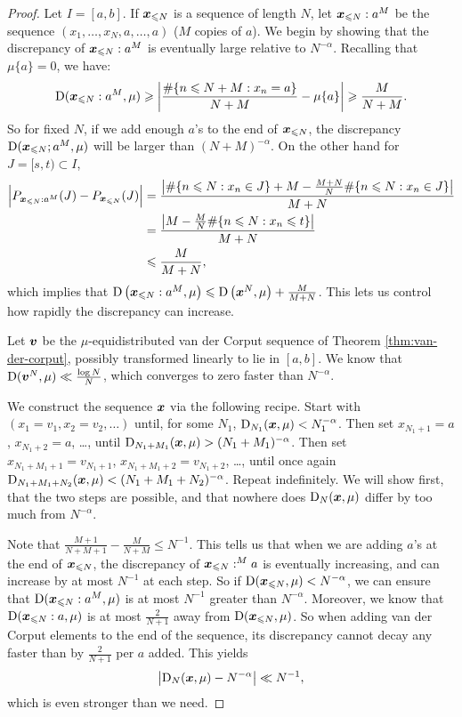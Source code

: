 \begin{proof}
Let $I = [a,b]$. If ${\boldsymbol x}_{\leqslant N}$ is a sequence of length $N$, let 
${\boldsymbol x}_{\leqslant N}: a^M$ be the sequence $(x_1,\dots,x_N,a,\dots,a)$ ($M$ copies 
of $a$). We begin by showing that the discrepancy of ${\boldsymbol x}_{\leqslant N}:a^M$ 
is eventually large relative to $N^{-\alpha}$. Recalling that $\mu\{a\} = 0$, 
we have:
\[
	\operatorname{D}({\boldsymbol x}_{\leqslant N}: a^M,\mu)
		\geqslant \left| \frac{\#\{ n\leqslant N+M : x_n = a\}}{N+M} - \mu\{a\}\right| 
		\geqslant \frac{M}{N+M} .
\]
So for fixed $N$, if we add enough $a$'s to the end of ${\boldsymbol x}_{\leqslant N}$, the 
discrepancy $\operatorname{D}({\boldsymbol x}_{\leqslant N};a^M,\mu)$ will be larger than 
$(N+M)^{-\alpha}$. On the other hand for $J = [s,t)\subset I$, 
\begin{align*}
	\left| P_{{\boldsymbol x}_{\leqslant N}: a^M}(J) - P_{{\boldsymbol x}_{\leqslant N}}(J)\right| 
		&= \frac{\left|\#\{n\leqslant N : x_n\in J\} + M - \frac{M+N}{N}\#\{n\leqslant N : x_n\in J\}\right|}{M+N} \\
		&= \frac{\left|M - \frac{M}{N} \#\{n\leqslant N : x_n \leqslant t\} \right|}{M+N} \\
		&\leqslant \frac{M}{M+N} ,
\end{align*}
which implies that 
$\operatorname{D}\left({\boldsymbol x}_{\leqslant N}: a^M,\mu\right) \leqslant \operatorname{D}\left({\boldsymbol x}^N,\mu\right) + \frac{M}{M+N}$. This lets us control how rapidly the discrepancy can increase. 

Let ${\boldsymbol v}$ be the $\mu$-equidistributed van der Corput sequence of 
Theorem \ref{thm:van-der-corput}, possibly transformed linearly to lie in 
$[a,b]$. We know that $\operatorname{D}({\boldsymbol v}^N, \mu) \ll \frac{\log N}{N}$, which converges 
to zero faster than $N^{-\alpha}$. 

We construct the sequence ${\boldsymbol x}$ via the following recipe. Start with 
$(x_1 = v_1,x_2 = v_2,\dots)$ until, for some $N_1$, 
$\operatorname{D}_{N_1}({\boldsymbol x},\mu) < N_1^{-\alpha}$. Then set $x_{N_1+1} = a$, 
$x_{N_1+2} = a$, \dots, until 
$\operatorname{D}_{N_1+M_1}({\boldsymbol x},\mu) > (N_1+M_1)^{-\alpha}$. Then set 
$x_{N_1+M_1+1} = v_{N_1+1}$, $x_{N_1+M_1+2} = v_{N_1+2}$, \dots, 
until once again 
$\operatorname{D}_{N_1+M_1+N_2}({\boldsymbol x},\mu) < (N_1+M_1+N_2)^{-\alpha}$. Repeat 
indefinitely. We will show first, that the two steps are possible, and that 
nowhere does $\operatorname{D}_N({\boldsymbol x},\mu)$ differ by too much from $N^{-\alpha}$. 

Note that $\frac{M+1}{N+M+1} - \frac{M}{N+M} \leqslant N^{-1}$. This tells 
us that when we are adding $a$'s at the end of ${\boldsymbol x}_{\leqslant N}$, the 
discrepancy of 
${\boldsymbol x}_{\leqslant N}:^M a$ is eventually increasing, and can increase by at most 
$N^{-1}$ at each 
step. So if $\operatorname{D}({\boldsymbol x}_{\leqslant N},\mu) < N^{-\alpha}$, we can ensure that 
$\operatorname{D}({\boldsymbol x}_{\leqslant N}: a^M,\mu)$ is at most $N^{-1}$ greater than 
$N^{-\alpha}$. 
Moreover, we know that $\operatorname{D}({\boldsymbol x}_{\leqslant N}: a,\mu)$ is at most 
$\frac{2}{N+1}$ away from $\operatorname{D}({\boldsymbol x}_{\leqslant N},\mu)$. So when adding van der 
Corput elements to the end of the sequence, its discrepancy cannot decay any 
faster than by $\frac{2}{N+1}$ per $a$ added. This yields 
\[
	\left|\operatorname{D}_N({\boldsymbol x},\mu) - N^{-\alpha}\right| \ll N^{-1} , 
\]
which is even stronger than we need.
\end{proof}

